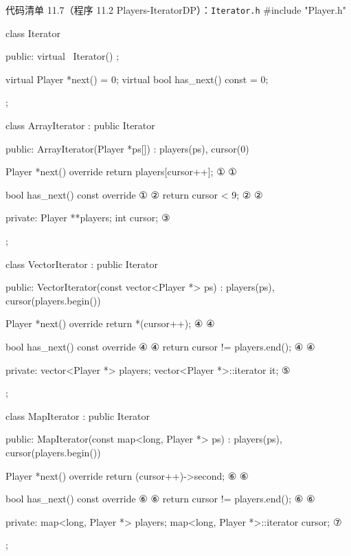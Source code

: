 \begin{codeboxt}{代码清单 11.7（程序 11.2 Players-IteratorDP）：\texttt{Iterator.\allowbreak{}h}}
#include "Player.h"

class Iterator
{
public:
    virtual ~Iterator() {};

    virtual Player *next() = 0;
    virtual bool has_next() const = 0;
};

class ArrayIterator : public Iterator
{
public:
    ArrayIterator(Player *ps[]) : players(ps), cursor(0) {}

    Player *next() override { return players[cursor++]; }  ①
                                                           ①

    bool has_next() const override                         ①
    {                                                      ②
        return cursor < 9;                                 ②
    }                                                      ②

private:
    Player **players;
    int cursor;                                            ③
};

class VectorIterator : public Iterator
{
public:
    VectorIterator(const vector<Player *> ps)
        : players(ps), cursor(players.begin()) {}

    Player *next() override { return *(cursor++); }        ④
                                                           ④

    bool has_next() const override                         ④
    {                                                      ④
        return cursor != players.end();                    ④
    }                                                      ④

private:
    vector<Player *> players;
    vector<Player *>::iterator it;                         ⑤
};

class MapIterator : public Iterator
{
public:
    MapIterator(const map<long, Player *> ps)
        : players(ps), cursor(players.begin()) {}

    Player *next() override { return (cursor++)->second; } ⑥
                                                           ⑥

    bool has_next() const override                         ⑥
    {                                                      ⑥
        return cursor != players.end();                    ⑥
    }                                                      ⑥

private:
    map<long, Player *> players;
    map<long, Player *>::iterator cursor;                  ⑦
};
\end{codeboxt}
